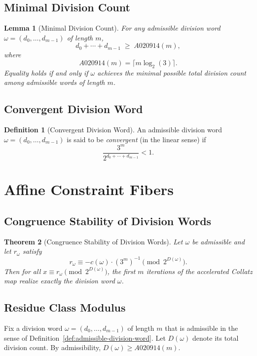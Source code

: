 \documentclass[12pt, oneside]{article}
\numberwithin{equation}{section}
\theoremstyle{definition}
\newtheorem{definition}{Definition}[section]
\theoremstyle{plain}
\newtheorem{theorem}{Theorem}[section]
\newtheorem{lemma}[theorem]{Lemma}
\theoremstyle{remark}
\begin{document}
\subsection{Minimal Division Count}

\begin{lemma}[Minimal Division Count]
For any admissible division word $\omega=(d_0,\dots,d_{m-1})$ of length $m$,
\[
d_0 + \cdots + d_{m-1} \;\ge\; A020914(m),
\]
where
\[
A020914(m) = \lceil m \log_2(3) \rceil.
\]
Equality holds if and only if $\omega$ achieves the minimal possible total
division count among admissible words of length $m$.
\end{lemma}

\subsection{Convergent Division Word}

\begin{definition}[Convergent Division Word]
An admissible division word $\omega = (d_0,\dots,d_{m-1})$ is said to be
\emph{convergent} (in the linear sense) if
\[
\frac{3^m}{2^{d_0+\cdots+d_{m-1}}} < 1.
\]
\end{definition}

\section{Affine Constraint Fibers}

\subsection{Congruence Stability of Division Words}

\begin{theorem}[Congruence Stability of Division Words]
Let $\omega$ be admissible and let $r_\omega$ satisfy
\[
r_\omega \equiv -c(\omega)\cdot (3^m)^{-1} \pmod{2^{D(\omega)}}.
\]
Then for all $x \equiv r_\omega \pmod{2^{D(\omega)}}$, the first $m$
iterations of the accelerated Collatz map realize exactly the division word $\omega$.
\end{theorem}

\subsection{Residue Class Modulus}

Fix a division word $\omega = (d_0,\dots,d_{m-1})$ of length $m$ that is admissible
in the sense of Definition~\ref{def:admissible-division-word}. Let $D(\omega)$
denote its total division count. By admissibility, $D(\omega) \ge A020914(m)$.
\end{document}
